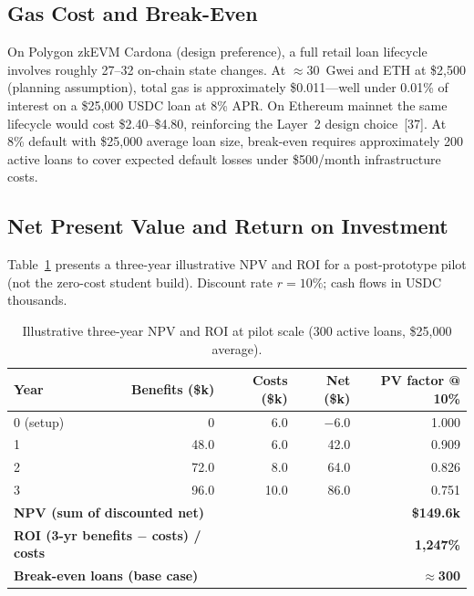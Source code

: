 \documentclass[12pt,a4paper]{report}
\newcommand{\tableheadcolor}{\rowcolor{TableHeadBg}}
\begin{document}
\subsection{Gas Cost and Break-Even}
\label{sec:gas-cost}

On Polygon zkEVM Cardona (design preference), a full retail loan lifecycle involves roughly 27--32 on-chain state changes. At ${\approx}$30~Gwei and ETH at \$2{,}500 (planning assumption), total gas is approximately \$0.011---well under 0.01\% of interest on a \$25{,}000 USDC loan at 8\% APR. On Ethereum mainnet the same lifecycle would cost \$2.40--\$4.80, reinforcing the Layer~2 design choice~[37]. At 8\% default with \$25{,}000 average loan size, break-even requires approximately 200 active loans to cover expected default losses under \$500/month infrastructure costs.

\subsection{Net Present Value and Return on Investment}
\label{sec:npv-roi}

Table~\ref{tab:npv-roi} presents a three-year illustrative NPV and ROI for a post-prototype pilot (not the zero-cost student build). Discount rate $r = 10\%$; cash flows in USDC thousands.

\begin{table}[H]
\centering
\caption[Illustrative three-year NPV and ROI (pilot scale)]{Illustrative three-year NPV and ROI at pilot scale (300 active loans, \$25{,}000 average).}
\label{tab:npv-roi}
\small
\begin{tabular}{@{}lrrrr@{}}
\toprule
\tableheadcolor
\textbf{Year} & \textbf{Benefits (\$k)} & \textbf{Costs (\$k)} & \textbf{Net (\$k)} & \textbf{PV factor @ 10\%} \\
\midrule
0 (setup) & 0 & 6.0 & $-$6.0 & 1.000 \\
1 & 48.0 & 6.0 & 42.0 & 0.909 \\
2 & 72.0 & 8.0 & 64.0 & 0.826 \\
3 & 96.0 & 10.0 & 86.0 & 0.751 \\
\midrule
\multicolumn{2}{l}{\textbf{NPV (sum of discounted net)}} & & \multicolumn{2}{r}{\textbf{\$149.6k}} \\
\multicolumn{2}{l}{\textbf{ROI (3-yr benefits $-$ costs) / costs}} & & \multicolumn{2}{r}{\textbf{1{,}247\%}} \\
\multicolumn{2}{l}{\textbf{Break-even loans (base case)}} & & \multicolumn{2}{r}{\textbf{$\approx$300}} \\
\bottomrule
\end{tabular}
\end{table}
\end{document}
